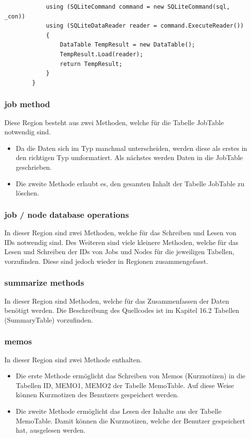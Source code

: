 \documentclass[12pt,a4paper]{report}
\begin{document}
\begin{onehalfspace}
\begin{lstlisting}
            using (SQLiteCommand command = new SQLiteCommand(sql, _con))
            using (SQLiteDataReader reader = command.ExecuteReader())
            {
                DataTable TempResult = new DataTable();
                TempResult.Load(reader);
                return TempResult;
            }
        }
\end{lstlisting}
\subsubsection{job method}
Diese Region besteht aus zwei Methoden, welche für die Tabelle JobTable notwendig sind.
\begin{itemize}
\item Da die Daten sich im Typ manchmal unterscheiden, werden diese als erstes in den richtigen Typ umformatiert. Als nächstes werden Daten in die JobTable geschrieben.
\item Die zweite Methode erlaubt es, den gesamten Inhalt der Tabelle JobTable zu löschen.
\end{itemize}
\subsubsection{job / node database operations}
In dieser Region sind zwei Methoden, welche für das Schreiben und Lesen von IDs notwendig sind.
Des Weiteren sind viele kleinere Methoden, welche für das Lesen und Schreiben der IDs von Jobs und Nodes für die jeweiligen Tabellen, vorzufinden. Diese sind jedoch wieder in Regionen zusammengefasst.
\subsubsection{summarize methods}
In dieser Region sind Methoden, welche für das Zusammenfassen der Daten benötigt werden.
Die Beschreibung des Quellcodes ist im Kapitel 16.2 Tabellen (SummaryTable) vorzufinden.
\subsubsection{memos}
In dieser Region sind zwei Methode enthalten.
\begin{itemize}
\item Die erste Methode ermöglicht das Schreiben von Memos (Kurznotizen) in die Tabellen ID, MEMO1, MEMO2 der Tabelle MemoTable. Auf diese Weise können Kurznotizen des Benutzers gespeichert werden.
\item Die zweite Methode ermöglicht das Lesen der Inhalte aus der Tabelle MemoTable. Damit können die Kurznotizen, welche der Benutzer gespeichert hat, ausgelesen werden.
\end{itemize}

\end{onehalfspace}
\end{document}
